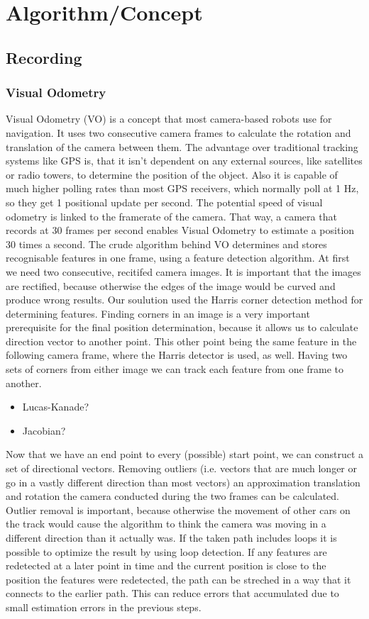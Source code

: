 \section{Algorithm/Concept}
\label{sec:algorithm}

\subsection{Recording}
\subsubsection{Visual Odometry}
Visual Odometry (VO) is a concept that most camera-based robots use for navigation. It uses two consecutive camera frames to calculate the rotation and translation of the camera between them. The advantage over traditional tracking systems like GPS is, that it isn't dependent on any external sources, like satellites or radio towers, to determine the position of the object.
Also it is capable of much higher polling rates than most GPS receivers, which normally poll at 1 Hz, so they get 1 positional update per second. The potential speed of visual odometry is linked to the framerate of the camera. That way, a camera that records at 30 frames per second enables Visual Odometry to estimate a position 30 times a second. 
The crude algorithm behind VO determines and stores recognisable features in one frame, using a feature detection algorithm.
At first we need two consecutive, recitifed camera images. It is important that the images are rectified, because otherwise the edges of the image would be curved and produce wrong results.
Our soulution used the Harris corner detection method for determining features. Finding corners in an image is a very important prerequisite for the final position determination, because it allows us to calculate direction vector to another point. This other point being the same feature in the following camera frame, where the Harris detector is used, as well.
Having two sets of corners from either image we can track each feature from one frame to another. 
\begin{itemize}
    \item Lucas-Kanade?
    \item Jacobian?
\end{itemize}
Now that we have an end point to every (possible) start point, we can construct a set of directional vectors.
Removing outliers (i.e. vectors that are much longer or go in a vastly different direction than most vectors) an approximation translation and rotation the camera conducted during the two frames can be calculated.
Outlier removal is important, because otherwise the movement of other cars on the track would cause the algorithm to think the camera was moving in a different direction than it actually was.
If the taken path includes loops it is possible to optimize the result by using loop detection. If any features are redetected at a later point in time and the current position is close to the position the features were redetected, the path can be streched in a way that it connects to the earlier path.
This can reduce errors that accumulated due to small estimation errors in the previous steps.

